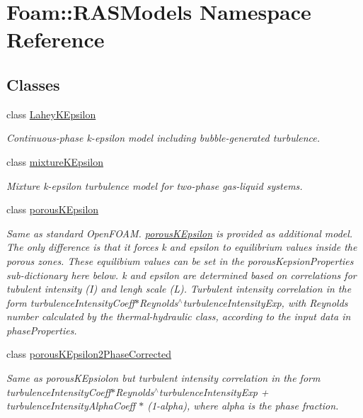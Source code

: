 \hypertarget{namespaceFoam_1_1RASModels}{}\section{Foam\+:\+:R\+A\+S\+Models Namespace Reference}
\label{namespaceFoam_1_1RASModels}
\subsection*{Classes}
\begin{DoxyCompactItemize}
\item 
class \hyperlink{classFoam_1_1RASModels_1_1LaheyKEpsilon}{Lahey\+K\+Epsilon}
\begin{DoxyCompactList}\small\item\em Continuous-\/phase k-\/epsilon model including bubble-\/generated turbulence. \end{DoxyCompactList}\item 
class \hyperlink{classFoam_1_1RASModels_1_1mixtureKEpsilon}{mixture\+K\+Epsilon}
\begin{DoxyCompactList}\small\item\em Mixture k-\/epsilon turbulence model for two-\/phase gas-\/liquid systems. \end{DoxyCompactList}\item 
class \hyperlink{classFoam_1_1RASModels_1_1porousKEpsilon}{porous\+K\+Epsilon}
\begin{DoxyCompactList}\small\item\em Same as standard Open\+F\+O\+AM. \hyperlink{classFoam_1_1RASModels_1_1porousKEpsilon}{porous\+K\+Epsilon} is provided as additional model. The only difference is that it forces k and epsilon to equilibrium values inside the porous zones. These equilibium values can be set in the porous\+Kepsion\+Properties sub-\/dictionary here below. k and epsilon are determined based on correlations for tubulent intensity (I) and lengh scale (L). Turbulent intensity correlation in the form turbulence\+Intensity\+Coeff$\ast$\+Reynolds$^\wedge$turbulence\+Intensity\+Exp, with Reynolds number calculated by the thermal-\/hydraulic class, according to the input data in phase\+Properties. \end{DoxyCompactList}\item 
class \hyperlink{classFoam_1_1RASModels_1_1porousKEpsilon2PhaseCorrected}{porous\+K\+Epsilon2\+Phase\+Corrected}
\begin{DoxyCompactList}\small\item\em Same as porous\+K\+Epsiolon but turbulent intensity correlation in the form turbulence\+Intensity\+Coeff$\ast$\+Reynolds$^\wedge$turbulence\+Intensity\+Exp + turbulence\+Intensity\+Alpha\+Coeff $\ast$ (1-\/alpha), where alpha is the phase fraction. \end{DoxyCompactList}\end{DoxyCompactItemize}
